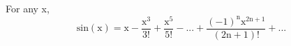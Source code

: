 For any x,
\[ \mathrm{sin(x)}
= \mathrm{x} 
- \frac{\mathrm{x}^3}{3!}
+ \frac{\mathrm{x}^5}{5!}
- ...
+ \frac{(-1)^{\mathrm{n}} \mathrm{x}^{2 \mathrm{n} + 1} }
{ (2 \mathrm{n} + 1 )!} 
+ ... \]